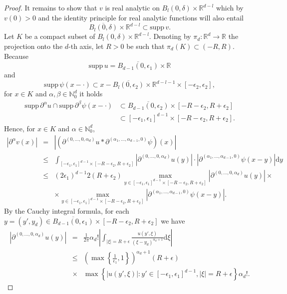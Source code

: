 \documentclass[a4paper,10pt]{amsart}
\newtheorem*{crucial lemma}{Lemma \ref{lem:nice polynomial2}}
\theoremstyle{definition}
\newcommand{\R}{\mathbb{R}}
\newcommand{\N}{\mathbb{N}}
\newcommand{\supp}{\mbox{supp}\,}
\begin{document}
\begin{proof}
	It remains to show that $v$ is real analytic on $B_l(0,\delta)\times\R^{d-l}$ which by $v(0)>0$ and the identity principle for real analytic functions will also entail
	$$\overline{B_{l}(0,\delta)}\times\R^{d-l}\subset \supp v. $$
	Let $K$ be a compact subset of $B_l(0,\delta)\times\R^{d-l}$. Denoting by $\pi_d\colon \R^d\rightarrow\R$ the projection onto the $d$-th axis, let $R>0$ be such that $\pi_d(K)\subset(-R,R)$. Because
	\[\supp u= \overline{B_{d-1}(0,\epsilon_1)}\times\R\]
	and
	\[\supp\psi(x-\cdot)\subset x-\overline{B_l(0,\epsilon_2)}\times\R^{d-l-1}\times\left[-\epsilon_2,\epsilon_2\right],\]
	for $x\in K$ and $\alpha,\beta\in\N_0^d$ it holds
    \begin{align*}
        \supp \partial^\alpha u\cap\supp\partial^\beta\psi(x-\cdot)& \subset\overline{B_{d-1}(0,\epsilon_2)}\times [-R-\epsilon_2,R+\epsilon_2]\\
        &\subset [-\epsilon_1,\epsilon_1]^{d-1}\times [-R-\epsilon_2,R+\epsilon_2].
    \end{align*}
	Hence, for $x\in K$ and $\alpha\in\N_0^d$,
	\begin{eqnarray}\label{eq:real analyticity 1}
		|\partial^\alpha v(x)|
		&=&\left|\left(\partial^{(0,\ldots,0,\alpha_d)}u\ast\partial^{(\alpha_1,\ldots,\alpha_{d-1},0)}\psi\right)(x)\right|\nonumber\\
		&\leq&\int_{[-\epsilon_1,\epsilon_1]^{d-1}\times[-R-\epsilon_2,R+\epsilon_2]}|\partial^{(0,\ldots,0,\alpha_d)}u(y)|\cdot\left|\partial^{(\alpha_1,\ldots,\alpha_{d-1},0)}\psi(x-y)\right|\mathrm{d}y\nonumber\\
		&\leq& (2\epsilon_1)^{d-1}2(R+\epsilon_2) \max_{y\in [-\epsilon_1,\epsilon_1]^{d-1}\times[-R-\epsilon_2,R+\epsilon_2]}\left|\partial^{(0,\ldots,0,\alpha_d)}u(y)\right|\times\nonumber\\
		&&\times \max_{y\in [-\epsilon_1,\epsilon_1]^{d-1}\times[-R-\epsilon_2,R+\epsilon_2]}\left|\partial^{(\alpha_1,\ldots,\alpha_{d-1},0)}\psi(x-y)\right|.
	\end{eqnarray}
	By the Cauchy integral formula, for each $y=(y',y_d)\in \overline{B_{d-1}(0,\epsilon_1)}\times[-R-\epsilon_2,R+\epsilon_2]$ we have
	\begin{eqnarray}\label{eq:real analyticity 2}
		\left|\partial^{(0,\ldots,0,\alpha_d)}u(y)\right|
		&=&\frac{1}{2\pi}\alpha_d!\left|\int_{|\xi|=R+\epsilon}\frac{u(y',\xi)}{(\xi-y_d)^{\alpha_d+1}}\mathrm{d}\xi\right|\nonumber\\
		&\leq& \left(\max\left\{\frac{1}{\epsilon_1},1\right\}\right)^{\alpha_d+1}(R+\epsilon)\\
        &\times&\max\left\{|u(y',\xi)|\colon y'\in\left[-\epsilon_1,\epsilon_1\right]^{d-1},|\xi|=R+\epsilon\right\}\alpha_d!.\nonumber
	\end{eqnarray}
	

\end{proof}
\end{document}
